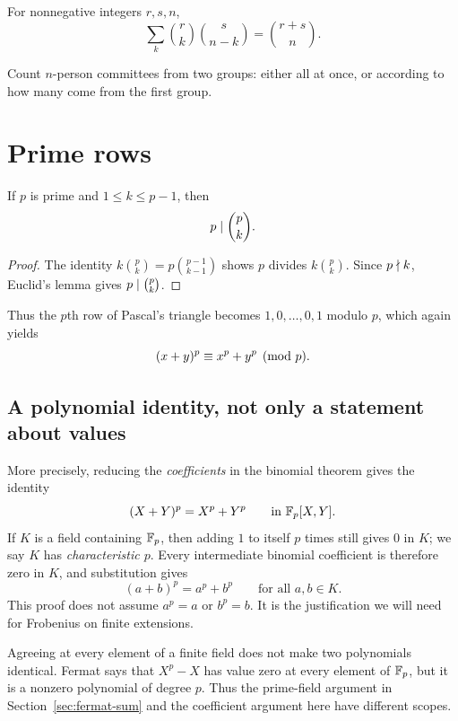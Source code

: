 \begin{proposition}[Vandermonde]
For nonnegative integers $r,s,n$,
\[
\sum_k\binom rk\binom s{n-k}=\binom{r+s}{n}.
\]
\end{proposition}

Count $n$-person committees from two groups: either all at once, or according to how many come from the first group.

\section{Prime rows}

\begin{theorem}
If $p$ is prime and $1\le k\le p-1$, then
\[
p\mid\binom pk.
\]
\end{theorem}

\begin{proof}
The identity $k\binom pk=p\binom{p-1}{k-1}$ shows $p$ divides $k\binom pk$. Since $p\nmid k$, Euclid's lemma gives $p\mid\binom pk$.
\end{proof}

Thus the $p$th row of Pascal's triangle becomes $1,0,\dots,0,1$ modulo $p$, which again yields
\[
(x+y)^p\equiv x^p+y^p\pmod p.
\]

\subsection*{A polynomial identity, not only a statement about values}
\label{sec:prime-binomial-identity}

More precisely, reducing the \emph{coefficients} in the binomial theorem
gives the identity
\[
 (X+Y)^p=X^p+Y^p\qquad\text{in }\mathbb F_p[X,Y].
\]
If $K$ is a field containing $\mathbb F_p$, then adding $1$ to itself $p$ times
still gives $0$ in $K$; we say $K$ has \emph{characteristic $p$}.
Every intermediate binomial coefficient is therefore zero in $K$, and
substitution gives
\[
 (a+b)^p=a^p+b^p\qquad\text{for all }a,b\in K.
\]
This proof does not assume $a^p=a$ or $b^p=b$.
It is the justification we will need for Frobenius on finite extensions.

\begin{warningbox}
Agreeing at every element of a finite field does not make two
polynomials identical. Fermat says that $X^p-X$ has value zero at every
element of $\mathbb F_p$, but it is a nonzero polynomial of degree $p$.
Thus the prime-field argument in Section~\ref{sec:fermat-sum} and the
coefficient argument here have different scopes.
\end{warningbox}

